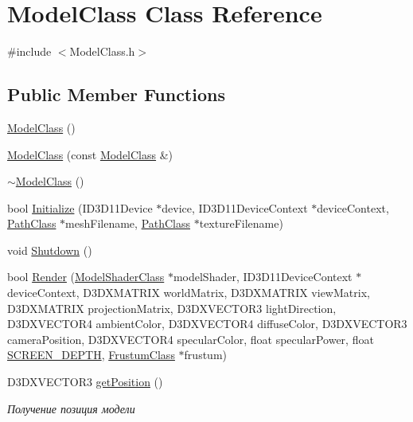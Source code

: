 \hypertarget{class_model_class}{}\section{Model\+Class Class Reference}
\label{class_model_class}


{\ttfamily \#include $<$Model\+Class.\+h$>$}

\subsection*{Public Member Functions}
\begin{DoxyCompactItemize}
\item 
\hyperlink{class_model_class_aeb071c40b6fc3b5fb187f25708a1fd3e}{Model\+Class} ()
\item 
\hyperlink{class_model_class_aeb339837cd8817e230079a1c8eb333a5}{Model\+Class} (const \hyperlink{class_model_class}{Model\+Class} \&)
\item 
\hyperlink{class_model_class_a8e1437289527dedb467aaa04cdbf90b9}{$\sim$\+Model\+Class} ()
\item 
bool \hyperlink{class_model_class_a0a79383e0c8b045480f776ad05cb059a}{Initialize} (I\+D3\+D11\+Device $\ast$device, I\+D3\+D11\+Device\+Context $\ast$device\+Context, \hyperlink{class_path_class}{Path\+Class} $\ast$mesh\+Filename, \hyperlink{class_path_class}{Path\+Class} $\ast$texture\+Filename)
\item 
void \hyperlink{class_model_class_a958ab747453c56b221525330e0cc7f18}{Shutdown} ()
\item 
bool \hyperlink{class_model_class_a5c20eb8481d13510ec8f411ef9f75316}{Render} (\hyperlink{class_model_shader_class}{Model\+Shader\+Class} $\ast$model\+Shader, I\+D3\+D11\+Device\+Context $\ast$device\+Context, D3\+D\+X\+M\+A\+T\+R\+IX world\+Matrix, D3\+D\+X\+M\+A\+T\+R\+IX view\+Matrix, D3\+D\+X\+M\+A\+T\+R\+IX projection\+Matrix, D3\+D\+X\+V\+E\+C\+T\+O\+R3 light\+Direction, D3\+D\+X\+V\+E\+C\+T\+O\+R4 ambient\+Color, D3\+D\+X\+V\+E\+C\+T\+O\+R4 diffuse\+Color, D3\+D\+X\+V\+E\+C\+T\+O\+R3 camera\+Position, D3\+D\+X\+V\+E\+C\+T\+O\+R4 specular\+Color, float specular\+Power, float \hyperlink{_graphics_class_8h_ae4d41ac39678c64d2ef730cecc77cc64}{S\+C\+R\+E\+E\+N\+\_\+\+D\+E\+P\+TH}, \hyperlink{class_frustum_class}{Frustum\+Class} $\ast$frustum)
\item 
D3\+D\+X\+V\+E\+C\+T\+O\+R3 \hyperlink{class_model_class_a21e42c01df8e01b99bcdd5225f52e4ef}{get\+Position} ()
\begin{DoxyCompactList}\small\item\em Получение позиция модели \end{DoxyCompactList}\item 

\end{DoxyCompactItemize}

